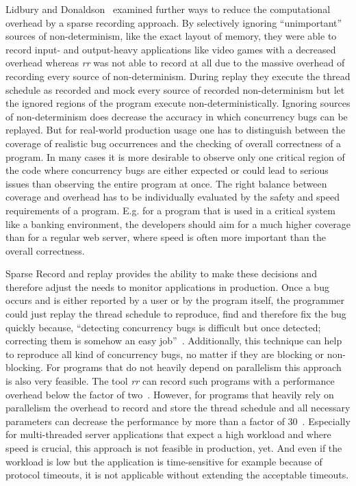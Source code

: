 \documentclass[conference]{IEEEtran}
\begin{document}
Lidbury and Donaldson~\cite{lidbury2019sparse} examined further ways to reduce the computational overhead by a sparse recording approach.
By selectively ignoring ``unimportant'' sources of non-determinism, like the exact layout of memory, they were able to record input- and output-heavy applications like video games with a decreased overhead whereas \emph{rr} was not able to record at all due to the massive overhead of recording every source of non-determinism.
During replay they execute the thread schedule as recorded and mock every source of recorded non-determinism but let the ignored regions of the program execute non-deterministically.
Ignoring sources of non-determinism does decrease the accuracy in which concurrency bugs can be replayed.
But for real-world production usage one has to distinguish between the coverage of realistic bug occurrences and the checking of overall correctness of a program.
In many cases it is more desirable to observe only one critical region of the code where concurrency bugs are either expected or could lead to serious issues than observing the entire program at once.
The right balance between coverage and overhead has to be individually evaluated by the safety and speed requirements of a program.
E.g. for a program that is used in a critical system like a banking environment, the developers should aim for a much higher coverage than for a regular web server, where speed is often more important than the overall correctness.

Sparse Record and replay provides the ability to make these decisions and therefore adjust the needs to monitor applications in production.
Once a bug occurs and is either reported by a user or by the program itself, the programmer could just replay the thread schedule to reproduce, find and therefore fix the bug quickly because, ``detecting concurrency bugs is difficult but once detected; correcting them is somehow an easy job''~\cite{tchamgoue2012testing}.
Additionally, this technique can help to reproduce all kind of concurrency bugs, no matter if they are blocking or non-blocking.
For programs that do not heavily depend on parallelism this approach is also very feasible.
The tool \emph{rr} can record such programs with a performance overhead below the factor of two~\cite{o2017engineering}.
However, for programs that heavily rely on parallelism the overhead to record and store the thread schedule and all necessary parameters can decrease the performance by more than a factor of 30~\cite{o2017engineering}.
Especially for multi-threaded server applications that expect a high workload and where speed is crucial, this approach is not feasible in production, yet.
And even if the workload is low but the application is time-sensitive for example because of protocol timeouts, it is not applicable without extending the acceptable timeouts.
\end{document}
